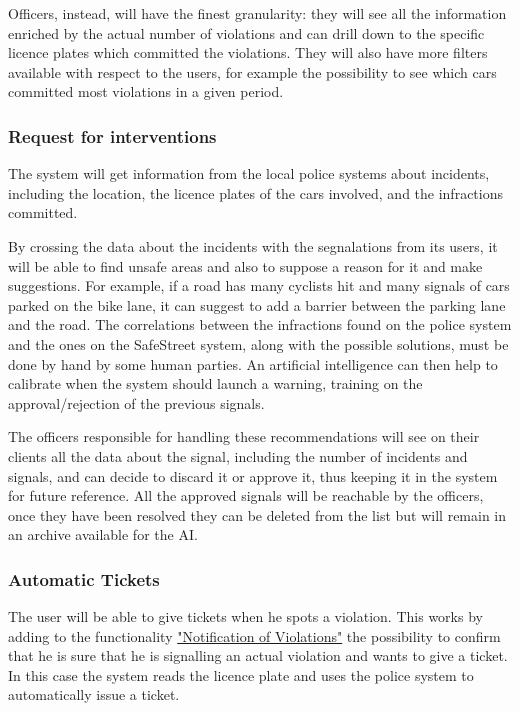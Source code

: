 Officers, instead, will have the finest granularity: they will see all the information enriched by the actual number of violations and can drill down to the specific licence plates which committed the violations.
They will also have more filters available with respect to the users, for example the possibility to see which cars committed most violations in a given period.

\subsubsection{Request for interventions}
The system will get information from the local police systems about incidents, including the location, the licence plates of the cars involved, and the infractions committed.

By crossing the data about the incidents with the segnalations from its users, it will be able to find unsafe areas and also to suppose a reason for it and make suggestions.
For example, if a road has many cyclists hit and many signals of cars parked on the bike lane, it can suggest to add a barrier between the parking lane and the road.
The correlations between the infractions found on the police system and the ones on the SafeStreet system, along with the possible solutions, must be done by hand by some human parties.
An artificial intelligence can then help to calibrate when the system should launch a warning, training on the approval/rejection of the previous signals.

The officers responsible for handling these recommendations will see on their clients all the data about the signal,
including the number of incidents and signals, and can decide to discard it or approve it, thus keeping it in the system for future reference.
All the approved signals will be reachable by the officers, once they have been resolved they can be deleted from the list but will remain in an archive available for the AI.


\subsubsection{Automatic Tickets}
The user will be able to give tickets when he spots a violation. This works by adding to the functionality
\hyperref[sec:notification_of_violations]{"Notification of Violations"}
the possibility to confirm that he is sure that he is signalling an actual violation and wants to give a ticket.
In this case the system reads the licence plate and uses the police system to automatically issue a ticket.

